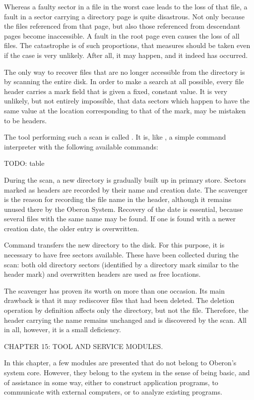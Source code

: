Whereas a faulty sector in a file in the worst case leads to the loss of that file, a fault in a sector carrying a directory page is quite disastrous. Not only because the files referenced from that page, but also those referenced from descendant pages become inaccessible. A fault in the root page even causes the loss of all files. The catastrophe is of such proportions, that measures should be taken even if the case is very unlikely. After all, it may happen, and it indeed has occurred.

The only way to recover files that are no longer accessible from the directory is by scanning the entire disk. In order to make a search at all possible, every file header carries a mark field that is given a fixed, constant value. It is very unlikely, but not entirely impossible, that data sectors which happen to have the same value at the location corresponding to that of the mark, may be mistaken to be headers.

The tool performing such a scan is called . It is, like , a simple command interpreter with the following available commands:

TODO: table

During the scan, a new directory is gradually built up in primary store. Sectors marked as headers are recorded by their name and creation date. The scavenger is the reason for recording the file name in the header, although it remains unused there by the Oberon System. Recovery of the date is essential, because several files with the same name may be found. If one is found with a newer creation date, the older entry is overwritten.

Command  transfers the new directory to the disk. For this purpose, it is necessary to have free sectors available. These have been collected during the scan: both old directory sectors (identified by a directory mark similar to the header mark) and overwritten headers are used as free locations.

The scavenger has proven its worth on more than one occasion. Its main drawback is that it may rediscover files that had been deleted. The deletion operation by definition affects only the directory, but not the file. Therefore, the header carrying the name remains unchanged and is discovered by the scan. All in all, however, it is a small deficiency.

\beginchapter CHAPTER 15: TOOL AND SERVICE MODULES.

In this chapter, a few modules are presented that do not belong to Oberon's system core. However, they belong to the system in the sense of being basic, and of assistance in some way, either to construct application programs, to communicate with external computers, or to analyze existing programs.


